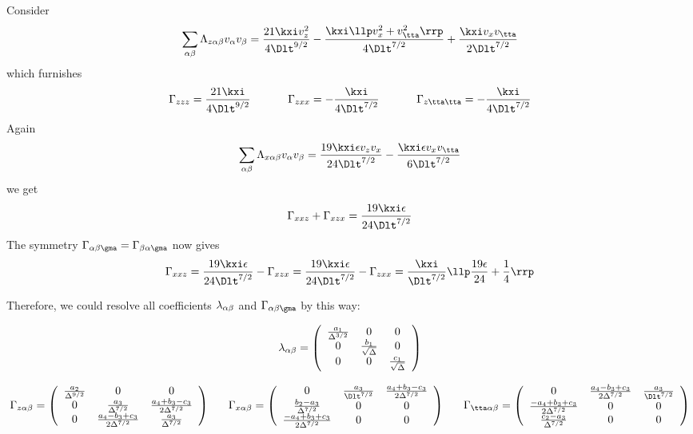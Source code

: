 \documentclass[fleqn,10pt]{InternshipReport_SI-ENS-PSL}
\begin{document}
Consider 
$$ \sum_{\ab} \Lambda_{z\ab} v_\al v_\bt = \frac{21 \kxi v_z^2}{4 \Dlt^{9/2}} - \frac{\kxi \llp v_x^2 + v_\tta^2 \rrp}{4 \Dlt^{7/2}} + \frac{\kxi v_x v_\tta}{2 \Dlt^{7/2}} $$
which furnishes
$$ \Gamma_{zzz} = \frac{21\kxi}{4 \Dlt^{9/2}} \tens \Gamma_{zxx} = - \frac{\kxi}{4 \Dlt^{7/2}} \tens \Gamma_{z\tta\tta} = - \frac{\kxi}{4 \Dlt^{7/2}} $$
Again
$$ \sum_{\ab} \Lambda_{x\ab} v_\al v_\bt = \frac{19 \kxi \eps v_z v_x}{24 \Dlt^{7/2}} - \frac{\kxi \eps v_x v_\tta}{6 \Dlt^{7/2}}  $$
we get
$$ \Gamma_{xxz} + \Gamma_{xzx} = \frac{19 \kxi \eps}{24 \Dlt^{7/2}} $$
The symmetry $\Gamma_{\ab\gma} = \Gamma_{\bt\al\gma}$ now gives
$$ \Gamma_{xxz} = \frac{19 \kxi \eps}{24 \Dlt^{7/2}} - \Gamma_{xzx} = \frac{19 \kxi \eps}{24 \Dlt^{7/2}} - \Gamma_{zxx} = \frac{\kxi}{\Dlt^{7/2}} \llp \frac{19 \eps}{24} + \frac{1}{4} \rrp $$


Therefore, we could resolve all coefficients $\lambda_{\alpha\beta}$ and $\Gamma_{\ab\gma}$ by this way:

$$ \lambda_{\alpha\beta} = \left(\begin{array}{ccc}\frac{a_1}{\Delta ^{3/2}} & 0 & 0 \\0 & \frac{b_1}{\sqrt{\Delta }} & 0 \\0 & 0 & \frac{c_1}{\sqrt{\Delta }}\end{array}\right) $$

$$ \Gamma_{z\ab} = \left(\begin{array}{ccc}\frac{a_2}{\Delta ^{9/2}} & 0 & 0 \\0 & \frac{a_3}{\Delta ^{7/2}} & \frac{a_4 + b_3 - c_3}{2 \Delta ^{7/2}} \\0 & \frac{a_4 - b_3 + c_3}{2 \Delta ^{7/2}} & \frac{a_3}{\Delta ^{7/2}}\end{array}\right) \fives 
\Gamma_{x\ab} = \left(\begin{array}{ccc}0 & \frac{a_3}{\Dlt^{7/2}} & \frac{a_4+b_3-c_3}{2 \Delta ^{7/2}} \\\frac{b_2-a_3}{\Delta ^{7/2}} & 0 & 0 \\\frac{-a_4+b_3+c_3}{2 \Delta ^{7/2}} & 0 & 0\end{array}\right) \fives 
\Gamma_{\tta\ab} = \left(\begin{array}{ccc}0 & \frac{a_4-b_3+c_3}{2 \Delta ^{7/2}} & \frac{a_3}{\Dlt^{7/2}} \\\frac{-a_4+b_3+c_3}{2 \Delta ^{7/2}} & 0 & 0 \\\frac{c_2-a_3}{\Delta ^{7/2}} & 0 & 0\end{array}\right) $$
\end{document}
